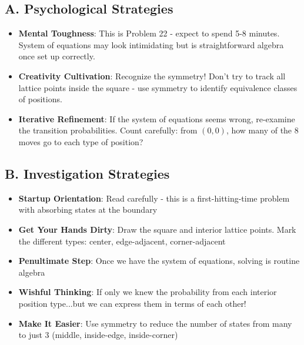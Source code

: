\documentclass[12pt]{article}
\begin{document}
\begin{strategicbox}

\subsection*{A. Psychological Strategies}
\begin{itemize}[leftmargin=*]
    \item \textbf{Mental Toughness}: This is Problem 22 - expect to spend 5-8 minutes. System of equations may look intimidating but is straightforward algebra once set up correctly.
    
    \item \textbf{Creativity Cultivation}: Recognize the symmetry! Don't try to track all lattice points inside the square - use symmetry to identify equivalence classes of positions.
    
    \item \textbf{Iterative Refinement}: If the system of equations seems wrong, re-examine the transition probabilities. Count carefully: from $(0,0)$, how many of the 8 moves go to each type of position?
\end{itemize}

\subsection*{B. Investigation Strategies}
\begin{itemize}[leftmargin=*]
    \item \textbf{Startup Orientation}: Read carefully - this is a first-hitting-time problem with absorbing states at the boundary
    
    \item \textbf{Get Your Hands Dirty}: Draw the square and interior lattice points. Mark the different types: center, edge-adjacent, corner-adjacent
    
    \item \textbf{Penultimate Step}: Once we have the system of equations, solving is routine algebra
    
    \item \textbf{Wishful Thinking}: If only we knew the probability from each interior position type...but we can express them in terms of each other!
    
    \item \textbf{Make It Easier}: Use symmetry to reduce the number of states from many to just 3 (middle, inside-edge, inside-corner)
    

\end{itemize}
\end{strategicbox}
\end{document}

